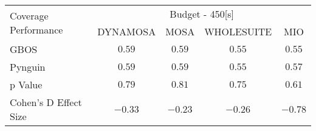 \begin{tabular}{lcccc}\toprule 
\multirow{2}{*}{Coverage Performance} & \multicolumn{4}{c}{Budget - 450[s] } \\ \cmidrule(lr){2-5}  
                                      & DYNAMOSA&MOSA&WHOLESUITE&MIO                         \\ \midrule 
GBOS                                  & \(0.59\)&\(0.59\)&\(0.55\)&\(0.55\)                       \\ 
Pynguin                               & \(0.59\)&\(0.59\)&\(0.55\)&\(0.57\)                       \\ 
p Value                               & \(0.79\)&\(0.81\)&\(0.75\)&\(0.61\)                     \\ 
Cohen's D Effect Size                 & \(-0.33\)&\(-0.23\)&\(-0.26\)&\(-0.78\)                       \\ 
\bottomrule 
\end{tabular}